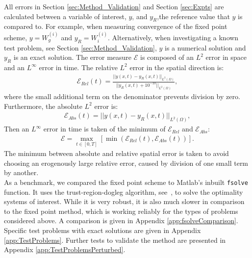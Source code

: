 All errors in Section \ref{sec:Method_Validation} and Section \ref{sec:Expts} are calculated between a variable of interest, $y$, and $y_R$,the reference value that $y$ is compared to. For example, when measuring convergence of the fixed point scheme, $y = W^{(i)}_g$ and $y_R = W^{(i)}_i$. Alternatively, when investigating a known test problem, see Section \ref{sec:Method_Validation}, $y$ is a numerical solution and $y_R$ is an exact solution. The error measure $\mathcal{E}$ is composed of an $L^2$ error in space and an $L^\infty$ error in time. The relative $L^2$ error in the spatial direction is:
\begin{align*}
\mathcal{E}_{Rel}(t) = \frac{|| y(x,t) - y_{R}(x,t)||_{L^2(\Omega)} }{||y_R(x,t) + 10^{-10}||_{L^2(\Omega)}},
\end{align*}
where the small additional term on the denominator prevents division by zero.
Furthermore, the absolute $L^2$ error is:
\begin{align*}
\mathcal{E}_{Abs}(t) = || y(x,t) - y_R(x,t)||_{L^2(\Omega)} ,
\end{align*}
Then an $L^\infty$ error in time is taken of the minimum of $\mathcal{E}_{Rel}$ and $\mathcal{E}_{Abs}$:
\begin{align*}
\mathcal{E} = \max_{t \in [0,T]}\left[\min\left(\mathcal{E}_{Rel}(t), \mathcal{E}_{Abs}(t)\right)\right].
\end{align*}
The minimum between absolute and relative spatial error is taken to avoid choosing an erogenously large relative error, caused by division of one small term by another.
\\
As a benchmark, we compared the fixed point scheme to Matlab's inbuilt \texttt{fsolve} function. It uses the trust-region-dogleg algorithm, see~\cite{Powell1}, to solve the optimality systems of interest. While it is very robust, it is also much slower in comparison to the fixed point method, which is working reliably for the types of problems considered above.
A comparison is given in Appendix \ref{app:fsolveComparison}.
Specific test problems with exact solutions are given in Appendix \ref{app:TestProblems}. 
Further tests to validate the method are presented in Appendix \ref{app:TestProblemsPerturbed}.
